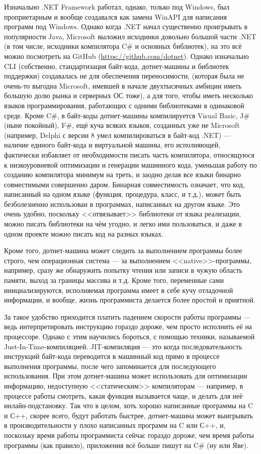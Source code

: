 \documentclass[a5paper]{article}
\begin{document}
Изначально .NET Framework работал, однако, только под Windows, был проприетарным и вообще создавался как замена WinAPI для написания программ под Windows. Однако когда .NET начал существенно проигрывать в популярности Java, Microsoft выложил исходники довольно большой части .NET (в том числе, исходники компилятора C\# и основных библиотек), на это всё можно посмотреть на GitHub (\url{https://github.com/dotnet}). Однако изначально CLI (собственно, стандартизация байт-кода, дотнет-машины и библиотек поддержки) создавалась не для обеспечения переносимости, (которая была не очень-то выгодна Microsoft, имевшей в начале двухтысячных амбиции иметь большую долю рынка и серверных ОС тоже), а для того, чтобы иметь несколько языков программирования, работающих с одними библиотеками в одинаковой среде. Кроме C\#, в байт-коды дотнет-машины компилируется Visual Basic, J\# (ныне покойный), F\#, ещё куча всяких языков, созданных уже не Microsoft (например, Delphi с версии 8 умел компилироваться в байт-код .NET) --- наличие единого байт-кода и виртуальной машины, его исполняющей, фактически избавляет от необходимости писать часть компилятора, относящуюся к низкоуровневой оптимизации и генерации машинного кода, уменьшая работу по созданию компилятора минимум на треть, и заодно делая все языки бинарно совместимыми совершенно даром. Бинарная совместимость означает, что код, написанный на одном языке (функция, процедура, класс, и т.д.), может быть безболезненно использован в программах, написанных на другом языке. Это очень удобно, поскольку <<отвязывает>> библиотеки от языка реализации, можно писать библиотеки на чём угодно, и легко ими пользоваться, и даже в одном проекте можно писать код на разных языках. 

Кроме того, дотнет-машина может следить за выполнением программы более строго, чем операционная система --- за выполнением <<native>>-программы, например, сразу же обнаружить попытку чтения или записи в чужую область памяти, выход за границы массива и т.д. Кроме того, переменные сами инициализируются, исполняемая программа имеет в себе кучу отладочной информации, и вообще, жизнь программиста делается более простой и приятной.

За такое удобство приходится платить падением скорости работы программы --- ведь интерпретировать инструкцию гораздо дороже, чем просто исполнить её на процессоре. Однако с этим научились бороться, с помощью техники, называемой Just-In-Time-компиляцией. JIT-компиляция --- это когда последовательность инструкций байт-кода переводится в машинный код прямо в процессе выполнения программы, после чего запоминается для последующего использования. При этом дотнет-машина может использовать для оптимизации информацию, недоступную <<статическим>> компиляторам --- например, в процессе работы смотреть, какая функция вызывается чаще, и делать для неё инлайн-подстановку. Так что в целом, хоть хорошо написанные программы на C и С++, скорее всего, будут работать быстрее, дотнет-машина может выигрывать в производительности у плохо написанных программ на C или С++, и, поскольку время работы программиста сейчас гораздо дороже, чем время работы программы (как правило), приложения всё больше пишут на C\# (ну или Яве).
\end{document}

